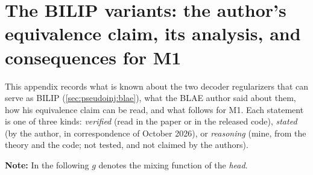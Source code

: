 \section{The BILIP variants: the author's equivalence claim, its analysis, and
consequences for M1}
\label{app:bilip}

This appendix records what is known about the two decoder regularizers that can serve
as BILIP (\cref{sec:pseudoinj:blae}), what the BLAE author said about them, how his
equivalence claim can be read, and what follows for M1. Each statement is one of
three
kinds: \emph{verified} (read in the paper or in the released code), \emph{stated} (by
the author, in correspondence of October 2026), or \emph{reasoning} (mine, from the
theory and the code; not tested, and not claimed by the authors).

\textbf{Note:} In the following $g$ denotes the mixing function of the \emph{head}.

